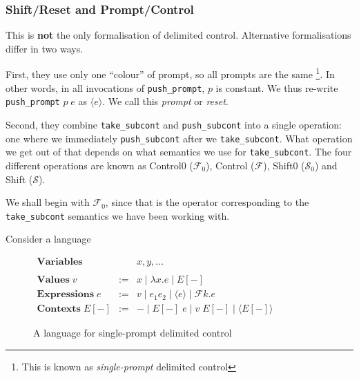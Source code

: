 \subsubsection{Shift/Reset and Prompt/Control}
This is \textbf{not} the only formalisation of delimited control. Alternative formalisations differ in two ways.

First, they use only one ``colour'' of prompt, so all prompts are the same \footnote{This is known as \textit{single-prompt} delimited control}. In other words, in all invocations of \texttt{push\_prompt}, $p$ is constant. We thus re-write \texttt{push\_prompt} $p \; e$ as $\langle e \rangle$. We call this \textit{prompt} or \textit{reset}. 

Second, they combine \texttt{take\_subcont} and \texttt{push\_subcont} into a single operation: one where we immediately \texttt{push\_subcont} after we \texttt{take\_subcont}. What operation we get out of that depends on what semantics we use for \texttt{take\_subcont}. The four different operations are known as Control0 ($\mathcal{F}_0$), Control ($\mathcal{F}$), Shift0 ($\mathcal{S}_0$) and Shift ($\mathcal{S}$).

We shall begin with $\mathcal{F}_0$, since that is the operator corresponding to the \texttt{take\_subcont} semantics we have been working with. 

Consider a language

\begin{figure}[H]
    \centering
    $\begin{array}{lrl}
        \textbf{Variables} & & x, y, \ldots \\
        \\
        \textbf{Values} \; v & := & x \mid \lambda x.e \mid E[-] \\
        \textbf{Expressions} \; e & := &v \mid e_1 e_2 \mid \langle e \rangle \mid \mathcal{F} k. e
        \\
        \textbf{Contexts}\; E[-] & := & - \mid E[-] \; e \mid v \; E[-] \mid \langle E[-] \rangle
    \end{array}$
    \caption{A language for single-prompt delimited control}
    \label{fig:language-delimited-control}
\end{figure}

